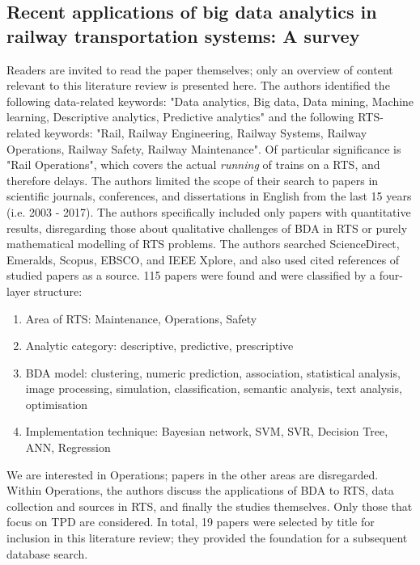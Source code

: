 \documentclass{article}
\begin{document}
\subsection{Recent applications of big data analytics in railway transportation systems: A survey \cite{ghofrani_et_al_2018}}

Readers are invited to read the paper themselves; only an overview of content relevant to this literature review is presented here.
The authors identified the following data-related keywords: "Data analytics, Big data, Data mining, Machine learning, Descriptive analytics, Predictive analytics" and the following RTS-related keywords: "Rail, Railway Engineering, Railway Systems, Railway Operations, Railway Safety, Railway Maintenance". Of particular significance is "Rail Operations", which covers the actual \textit{running} of trains on a RTS, and therefore delays.
The authors limited the scope of their search to papers in scientific journals, conferences, and dissertations in English from the last 15 years (i.e. 2003 - 2017). 
The authors specifically included only papers with quantitative results, disregarding those about qualitative challenges of BDA in RTS or purely mathematical modelling of RTS problems.
The authors searched ScienceDirect, Emeralds, Scopus, EBSCO, and IEEE Xplore, and also used cited references of studied papers as a source. 
115 papers were found and were classified by a four-layer structure:

\begin{enumerate}
	\item Area of RTS: Maintenance, Operations, Safety
	\item Analytic category: descriptive, predictive, prescriptive
	\item BDA model: clustering, numeric prediction, association, statistical analysis, image processing, simulation, classification, semantic analysis, text analysis, optimisation
	\item Implementation technique: Bayesian network, SVM, SVR, Decision Tree, ANN, Regression
\end{enumerate}

We are interested in Operations; papers in the other areas are disregarded. Within Operations, the authors discuss the applications of BDA to RTS, data collection and sources in RTS, and finally the studies themselves.
Only those that focus on TPD are considered. In total, 19 papers were selected by title for inclusion in this literature review; they provided the foundation for a subsequent database search.
\end{document}
